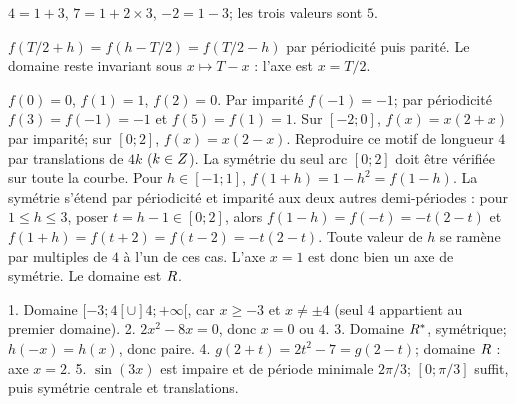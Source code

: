 \begin{corrige}\label{sol-t11s-c01-e28}$4=1+3$, $7=1+2\times3$, $-2=1-3$; les trois valeurs sont $5$.
\end{corrige}
\begin{corrige}\label{sol-t11s-c01-e29}$f(T/2+h)=f(h-T/2)=f(T/2-h)$ par périodicité puis parité. Le domaine reste invariant sous $x\mapsto T-x$ : l’axe est $x=T/2$.
\end{corrige}
\begin{corrige}\label{sol-t11s-c01-problem}
$f(0)=0$, $f(1)=1$, $f(2)=0$. Par imparité $f(-1)=-1$; par périodicité $f(3)=f(-1)=-1$ et $f(5)=f(1)=1$.
Sur $[-2;0]$, $f(x)=x(2+x)$ par imparité; sur $[0;2]$, $f(x)=x(2-x)$. Reproduire ce motif de longueur $4$ par translations de $4k$ ($k\in Z$).
La symétrie du seul arc $[0;2]$ doit être vérifiée sur toute la courbe. Pour $h\in[-1;1]$, $f(1+h)=1-h^2=f(1-h)$. La symétrie s’étend par périodicité et imparité aux deux autres demi-périodes : pour $1\le h\le3$, poser $t=h-1\in[0;2]$, alors $f(1-h)=f(-t)=-t(2-t)$ et $f(1+h)=f(t+2)=f(t-2)=-t(2-t)$. Toute valeur de $h$ se ramène par multiples de $4$ à l’un de ces cas. L’axe $x=1$ est donc bien un axe de symétrie. Le domaine est $R$.
\end{corrige}
\begin{corrige}\label{sol-t11s-c01-test}
1. Domaine $[-3;4[\cup]4;+\infty[$, car $x\ge-3$ et $x\ne\pm4$ (seul $4$ appartient au premier domaine).
2. $2x^2-8x=0$, donc $x=0$ ou $4$.
3. Domaine $R^*$, symétrique; $h(-x)=h(x)$, donc paire.
4. $g(2+t)=2t^2-7=g(2-t)$; domaine $R$ : axe $x=2$.
5. $\sin(3x)$ est impaire et de période minimale $2\pi/3$; $[0;\pi/3]$ suffit, puis symétrie centrale et translations.
\end{corrige}

